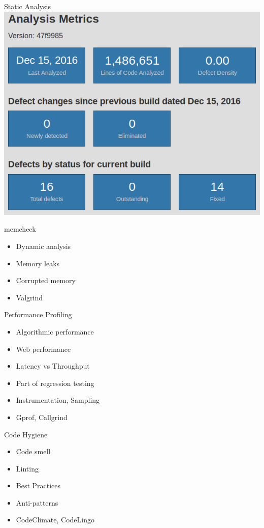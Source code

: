 \documentclass{beamer}
\begin{document}
\begin{frame}{Static Analysis}
	\includegraphics[width=\linewidth]{coverity-metrics.png}
\end{frame}

\begin{frame}{memcheck}
	\begin{itemize}
		\item Dynamic analysis
		\item Memory leaks
		\item Corrupted memory
		\item Valgrind
	\end{itemize}
\end{frame}

\begin{frame}{Performance Profiling}
	\begin{itemize}
		\item Algorithmic performance
		\item Web performance
		\item Latency vs Throughput
		\item Part of regression testing
		\item Instrumentation, Sampling
		\item Gprof, Callgrind
	\end{itemize}
\end{frame}

\begin{frame}{Code Hygiene}
	\begin{itemize}
		\item Code smell
		\item Linting
		\item Best Practices
		\item Anti-patterns
		\item CodeClimate, CodeLingo
	\end{itemize}
\end{frame}
\end{document}
